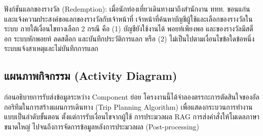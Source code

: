 ฟังก์ชันแลกของรางวัล (Redemption): เมื่อนักท่องเที่ยวเดินทางมาถึงสำนักงาน ททท. ขอนแก่นและแจ้งความประสงค์ขอแลกของรางวัลกับเจ้าหน้าที่ เจ้าหน้าที่ค้นหาบัญชีผู้ใช้และเลือกของรางวัลในระบบ ภายใต้เงื่อนไขทางเลือก 2 กรณี คือ (1) บัญชียังใช้งานได้ พอยท์เพียงพอ และของรางวัลมีสต็อก ระบบหักพอยท์ ลดสต็อก และบันทึกประวัติการแลก หรือ (2) ไม่เป็นไปตามเงื่อนไขข้อใดข้อหนึ่ง ระบบแจ้งสาเหตุและไม่บันทึกการแลก

\subsection{แผนภาพกิจกรรม (Activity Diagram)}

ก่อนอธิบายการรับส่งข้อมูลระหว่าง Component ย่อย โครงงานนี้ได้จำลองตรรกะการตัดสินใจของอัลกอริทึมในการสร้างแผนการเดินทาง (Trip Planning Algorithm) เพื่อแสดงกระบวนการทำงานแบบเป็นลำดับขั้นตอน ตั้งแต่การรับเงื่อนไขจากผู้ใช้ การประมวลผล RAG การส่งคำสั่งให้โมเดลภาษาขนาดใหญ่ ไปจนถึงการจัดการข้อมูลหลังการประมวลผล (Post-processing)


